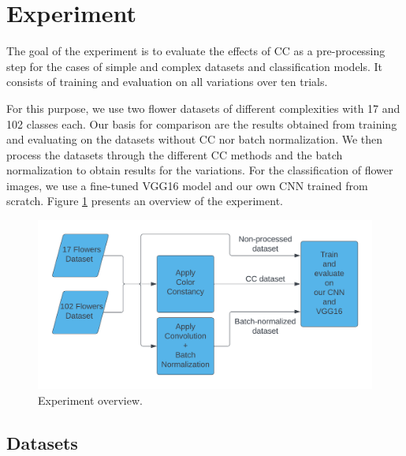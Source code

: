 

\section{Experiment}

The goal of the experiment is to evaluate the effects of \gls{CC} as a pre-processing step for the cases
of simple and complex datasets and classification models.
It consists of training and evaluation on all variations over ten trials.

For this purpose, we use two flower datasets of different complexities with 17 and 102 classes each. Our basis for comparison
are the results obtained from training and evaluating on the datasets without \gls{CC} nor batch normalization.
We then process the datasets through the different \gls{CC} methods and the batch normalization to obtain results
for the variations. For the classification of flower images, we use a fine-tuned VGG16 model and our own \gls{CNN} trained from scratch.
Figure \ref{fig:experiment_pipeline} presents an overview of the experiment.

\begin{figure}[ht]
    \centering
    \includegraphics[width=\textwidth]{images/experiment_pipeline.png}
    \caption{Experiment overview.}
    \label{fig:experiment_pipeline}
\end{figure}

\subsection{Datasets}

